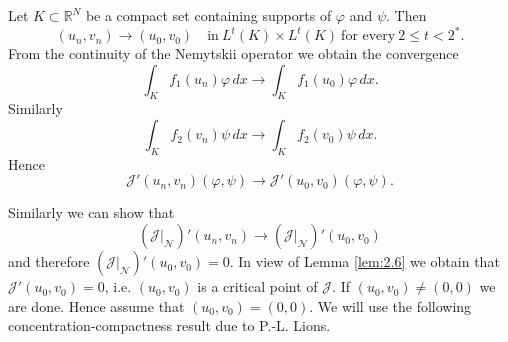\documentclass{scrartcl}
\newtheorem{Rem}[Th]{Remark}
\newcommand{\cJ}{{\mathcal J}}
\newcommand{\cN}{{\mathcal N}}
\newcommand{\R}{\mathbb{R}}
\numberwithin{equation}{section}
\DeclareMathOperator{\supp}{\mathrm{supp}\,}
\begin{document}
Let $K \subset \R^N$ be a compact set containing supports of $\varphi$ and $\psi$. Then
$$
(u_n, v_n) \to (u_0, v_0) \quad \mbox{in} \ L^t (K) \times L^t (K) \ \mbox{for every} \ 2 \leq t < 2^*.
$$
From the continuity of the Nemytskii operator we obtain the convergence
$$
\int_{K} f_1 (u_n) \varphi  \, dx \to \int_{K} f_1 (u_0) \varphi  \, dx.
$$
Similarly 
$$
\int_{K} f_2 (v_n) \psi  \, dx \to \int_{K} f_2 (v_0) \psi  \, dx.
$$
Hence
$$
\cJ'(u_n,v_n) (\varphi, \psi) \to \cJ'(u_0, v_0) (\varphi, \psi).
$$


Similarly we can show that 
$$
\left( \cJ \Big|_\cN \right)' (u_n, v_n) \to \left( \cJ \Big|_\cN \right)' (u_0, v_0) 
$$
and therefore $\left( \cJ \Big|_\cN \right)' (u_0, v_0) = 0$. In view of Lemma \ref{lem:2.6} we obtain that $\cJ'(u_0,v_0) = 0$, i.e. $(u_0,v_0)$ is a critical point of $\cJ$. If $(u_0,v_0) \neq (0,0)$ we are done. Hence assume that $(u_0, v_0) = (0,0)$. We will use the following concentration-compactness result due to P.-L. Lions.
\end{document}
